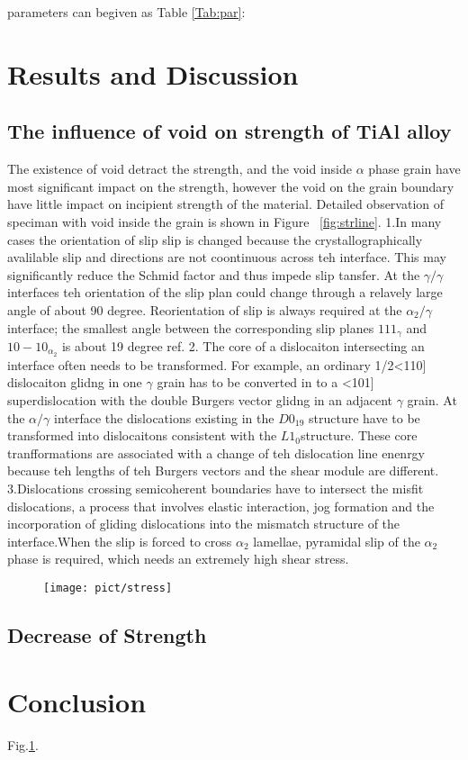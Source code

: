 \documentclass[final,5p,times,twocolumn]{elsarticle}
\begin{document}
parameters can begiven as Table \ref{Tab:par}:



\section{Results and Discussion}

\subsection{The influence of void on strength of TiAl alloy}

The existence of void detract the strength, and the void inside $\alpha$ phase grain have most significant  impact on the strength, however the void on the grain boundary have little impact on incipient strength of the material. Detailed observation of speciman with void inside the grain is shown in Figure ~\ref{fig:strline}.
1.In many cases the orientation of slip slip is changed because the crystallographically avalilable slip and directions are not coontinuous across teh interface. This may significantly reduce the Schmid factor and thus impede slip tansfer. At the $\gamma/\gamma$ interfaces teh orientation of the slip plan could change through a relavely large angle of about 90 degree. Reorientation of slip is always required at the $\alpha_{2} / \gamma$ interface; the smallest angle between the corresponding slip planes ${1 1 1 }_{\gamma}$ and ${ 1 0 -1 0}_{\alpha_2}$ is about 19 degree ref{}.
2. The core of  a dislocaiton intersecting an interface often needs to be transformed. For example, an ordinary 1/2<110] dislocaiton glidng in one $\gamma$ grain has to be converted in to a <101] superdislocation with the double Burgers vector glidng in an adjacent $\gamma$ grain. At the $\alpha/\gamma$ interface the dislocations existing in the $D0_{19}$ structure have to be transformed into dislocaitons consistent with the $L1_0$structure. These core tranfformations are associated with a change of teh dislocation line enenrgy because teh lengths of teh Burgers vectors and the shear module are different.
3.Dislocations crossing semicoherent boundaries have to intersect the misfit dislocations, a process that involves elastic interaction, jog formation and the incorporation of gliding dislocations into the mismatch structure of the interface.When the slip is forced to cross $\alpha_2$ lamellae, pyramidal slip of the $\alpha_2$ phase is required, which needs an extremely high shear stress.
\begin{figure}
	\centering
	\texttt{[image: pict/stress]}
	\caption{}
	\centering
	\label{fig:stress}
\end{figure}



\subsection{Decrease of Strength}


\section{Conclusion}





Fig.\ref{fig:stress}.
\end{document}
